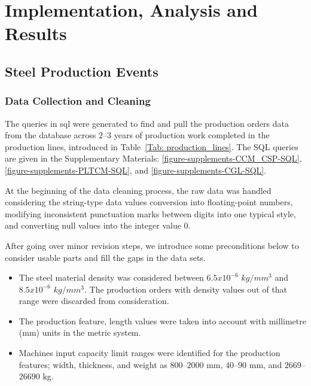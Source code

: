 \chapter{Implementation, Analysis and Results}\label{implementation_analysis}
\section{Steel Production Events}
\subsection{Data Collection and Cleaning}

The queries in \ac{sql} were generated to find and pull the production orders data from the database across $2$--$3$ years of production work completed in the production lines, introduced in Table~\ref{Tab: production_lines}. The SQL queries are given in the Supplementary Materials: \ref{figure-supplements-CCM_CSP-SQL}, \ref{figure-supplements-PLTCM-SQL}, and \ref{figure-supplements-CGL-SQL}.

At the beginning of the data cleaning process, the raw data was handled considering the string-type data values conversion into floating-point numbers, modifying inconsistent punctuation marks between digits into one typical style, and converting null values into the integer value $0$. 

After going over minor revision steps, we introduce some preconditions below to consider usable parts and fill the gaps in the data sets.
\begin{itemize}
	\item The steel material density was considered between $6.5 x 10^{-6}$ $kg/mm^{3}$ and $8.5 x 10^{-6}$ $kg/mm^{3}$. The production orders with density values out of that range were discarded from consideration.
	\item The production feature, length values were taken into account with millimetre (mm) units in the metric system.
	\item Machines input capacity limit ranges were identified for the production features; width, thickness, and weight as $800$--$2000$ mm, $40$--$90$ mm, and $2669$--$26690$ kg.
\end{itemize}


